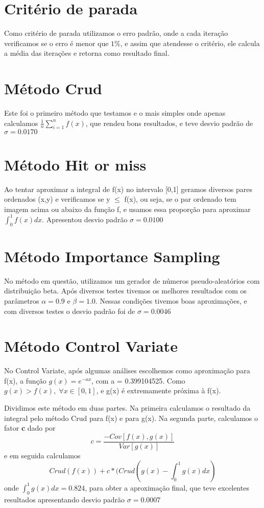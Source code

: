 \documentclass{article}
\begin{document}
\section{Critério de parada}
Como critério de parada utilizamos o erro padrão, onde a cada iteração verificamos se o erro é menor que $1\%
$, e assim que atendesse o critério, ele calcula a média das iterações e retorna como resultado final.


\section{Método Crud}
Este foi o primeiro método que testamos e o mais simples onde apenas calculamos $\frac{1}{n}\sum_{i=1}^n f(x)$, que rendeu bons resultados, e teve desvio padrão de $\sigma = 0.0170$
        

\section{Método Hit or miss}
Ao tentar aproximar a integral de f(x) no intervalo [0,1] geramos diversos pares ordenados (x,y) e verificamos se y $\leq$ f(x), ou seja, se o par ordenado tem imagem acima ou abaixo da função f, e usamos essa proporção para aproximar $\int_0^1 f(x)dx$. Apresentou desvio padrão $\sigma = 0.0100$ 

\section{Método Importance Sampling}
No método em questão, utilizamos um gerador de números pseudo-aleatórios com distribuição beta. Após diversos testes tivemos os melhores resultados com os parâmetros $ \alpha = 0.9 $ e $ \beta = 1.0 $. Nessas condições tivemos boas aproximações, e com diversos testes o desvio padrão foi de $ \sigma = 0.0046$

\section{Método Control Variate}
No Control Variate, após algumas análises escolhemos como aproximação para f(x), a função $ g(x) = e ^ {-ax}$, com a = 0.399104525. Como $ g(x) > f(x), \; \forall x \in [0,1] $, e g(x) é extremamente próxima à f(x).
\par
Dividimos este método em duas partes. Na primeira calculamos o resultado da integral pelo método Crud para f(x) e para g(x). Na segunda parte, calculamos o fator \textbf{c} dado por $$c = \frac{-Cov[f(x),g(x)]}{Var[g(x)]}$$ e em seguida calculamos $$Crud(f(x)) + c * (Crud(g(x) - \int_0^1 g(x) dx )$$ onde $\int_0^1 g(x) dx = 0.824$, para obter a aproximação final, que teve excelentes resultados apresentando desvio padrão $\sigma = 0.0007$
\end{document}
